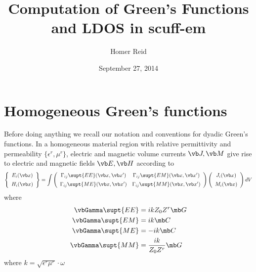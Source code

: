\documentclass[letterpaper]{article}
\title {Computation of Green's Functions and LDOS in {\sc scuff-em}}
\author {Homer Reid}
\date {September 27, 2014}
\begin{document}
\pagestyle{myheadings}
\maketitle

\tableofcontents

\newpage
\section{Homogeneous Green's functions}

Before doing anything we recall our notation and conventions
for dyadic Green's functions.
In a homogeneous material region with relative permittivity
and permeability $\{\epsilon^r, \mu^r\}$, electric and magnetic
volume currents $\vb J, \vb M$ give rise to electric and magnetic
fields $\vb E, \vb H$ according to 
$$
\left\{\begin{array}{c} E_i(\vb x) \\[5pt] H_i(\vb x) \end{array}\right\}
=
\int
\left(\begin{array}{cc}
 \Gamma_{ij}\supt{EE}(\vb x, \vb x^\prime) &
 \Gamma_{ij}\supt{EM}(\vb x, \vb x^\prime) \\[5pt]
 \Gamma_{ij}\supt{ME}(\vb x, \vb x^\prime) &
 \Gamma_{ij}\supt{MM}(\vb x, \vb x^\prime)
\end{array}\right)
\left(\begin{array}{c} J_i(\vb x) \\[5pt] M_i(\vb x) \end{array}\right)
dV
$$
where
\begin{subequations}
\begin{align}
 \vbGamma\supt{EE} &= ikZ_0 Z^r \mb G \\
 \vbGamma\supt{EM} &= ik        \mb C \\
 \vbGamma\supt{ME} &= -ik       \mb C \\
 \vbGamma\supt{MM} &= \frac{ik}{Z_0 Z^r} \mb G
\end{align}
\label{GammaFromGC}
\end{subequations}
where $k=\sqrt{\epsilon^r \mu^r}\cdot \omega$
\end{document}
